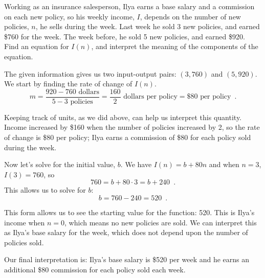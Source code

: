 

\begin{example}
Working as an insurance salesperson, Ilya earns a base salary and a commission on each new policy, so his weekly income, $I$, depends on the number of new policies, $n$, he sells during the week. Last week he sold 3 new policies, and earned \$760 for the week. The week before, he sold 5 new policies, and earned \$920. Find an equation for $I(n)$, and interpret the meaning of the components of the equation.

\begin{solution} The given information gives us two input-output pairs: $(3,760)$ and $(5,920)$. We start by finding the rate of change of $I(n)$.
$$m = \frac{920-760 \mbox{ dollars}}{5-3\mbox{ policies}}=\frac{160}{2} \mbox{ dollars per policy} = \$80 \mbox{ per policy} \enspace .$$

Keeping track of units, as we did above, can help us interpret this quantity. Income increased by \$160 when the number of policies increased by 2, so the rate of change is \$80 per policy; Ilya earns a commission of \$80 for each policy sold during the week.

Now let's solve for the initial value, $b$. We have $I(n) = b + 80n$ and when $n = 3$, $I(3) = 760$, so
$$760 = b+80\cdot 3 = b + 240 \enspace .$$
This allows us to solve for $b$:
$$b = 760 - 240 = 520 \enspace .$$

This form allows us to see the starting value for the function: 520. This is Ilya's income when $n = 0$, which means no new policies are sold. We can interpret this as Ilya's base salary for the week, which does not depend upon the number of policies sold.

Our final interpretation is: Ilya's base salary is \$520 per week and he earns an additional \$80 commission for each policy sold each week.
\end{solution}\end{example}


